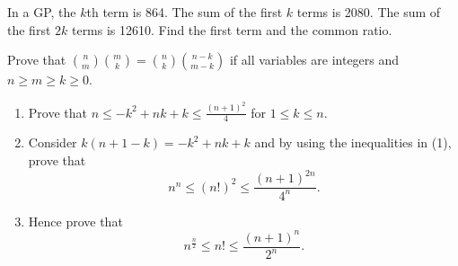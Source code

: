 \begin{problems}
    \problem In a GP, the $k$th term is 864. The sum of the first $k$ terms is
    2080. The sum of the first $2k$ terms is 12610. Find the first term and the
    common ratio.
    
    \problem Prove that $\binom{n}{m}\binom{m}{k} = \binom{n}{k}\binom{n - k}{m
    - k}$ if all variables are integers and $n \geq m \geq k \geq 0$.
    
    \problem
    \begin{enumerate}
        \item Prove that $n \leq -k^2 + nk + k \leq \frac{(n + 1)^2}{4}$ for $1
            \leq k \leq n$. 
        
        \item Consider $k(n + 1 - k) = -k^2 + nk + k$ and by using the
            inequalities in (1), prove that \[n^n \leq (n!)^2 \leq \frac{(n +
            1)^{2n}}{4^n}.\]
        
        \item Hence prove that \[n^{\frac{n}{2}} \leq n! \leq \frac{(n +
            1)^n}{2^n}.\]
    \end{enumerate}
\end{problems}
